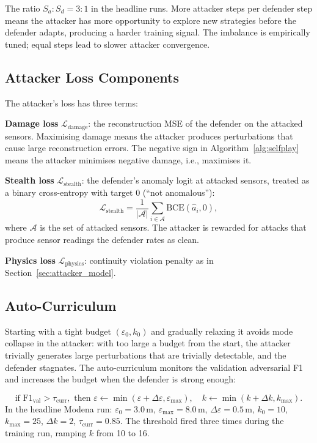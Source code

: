 The ratio $S_a : S_d = 3 : 1$ in the headline runs. More attacker
steps per defender step means the attacker has more opportunity to
explore new strategies before the defender adapts, producing a harder
training signal. The imbalance is empirically tuned; equal steps
lead to slower attacker convergence.

\subsection{Attacker Loss Components}

The attacker's loss has three terms:

\textbf{Damage loss} $\mathcal{L}_\text{damage}$: the reconstruction
MSE of the defender on the attacked sensors. Maximising
damage means the attacker produces perturbations that cause large
reconstruction errors. The negative sign in Algorithm~\ref{alg:selfplay}
means the attacker minimises negative damage, i.e., maximises it.

\textbf{Stealth loss} $\mathcal{L}_\text{stealth}$: the defender's
anomaly logit at attacked sensors, treated as a binary cross-entropy
with target 0 (``not anomalous''):
\begin{equation}
  \mathcal{L}_\text{stealth} = \frac{1}{|\mathcal{A}|}
    \sum_{i \in \mathcal{A}} \mathrm{BCE}(\hat{a}_i, 0),
\end{equation}
where $\mathcal{A}$ is the set of attacked sensors. The attacker
is rewarded for attacks that produce sensor readings the defender
rates as clean.

\textbf{Physics loss} $\mathcal{L}_\text{physics}$: continuity
violation penalty as in Section~\ref{sec:attacker_model}.

\subsection{Auto-Curriculum}
\label{sec:curriculum}

Starting with a tight budget $(\varepsilon_0, k_0)$ and gradually
relaxing it avoids mode collapse in the attacker: with too large a
budget from the start, the attacker trivially generates large
perturbations that are trivially detectable, and the defender
stagnates. The auto-curriculum monitors the validation adversarial
F1 and increases the budget when the defender is strong enough:

\begin{equation}
  \text{if } \mathrm{F1}_\text{val} > \tau_\text{curr},
  \text{ then }
  \varepsilon \leftarrow \min(\varepsilon + \Delta\varepsilon,
    \varepsilon_\text{max}),
  \quad
  k \leftarrow \min(k + \Delta k, k_\text{max}).
\end{equation}
In the headline Modena run:
$\varepsilon_0 = 3.0$\,m, $\varepsilon_\text{max} = 8.0$\,m,
$\Delta\varepsilon = 0.5$\,m, $k_0 = 10$, $k_\text{max} = 25$,
$\Delta k = 2$, $\tau_\text{curr} = 0.85$. The threshold fired
three times during the training run, ramping $k$ from 10 to 16.

